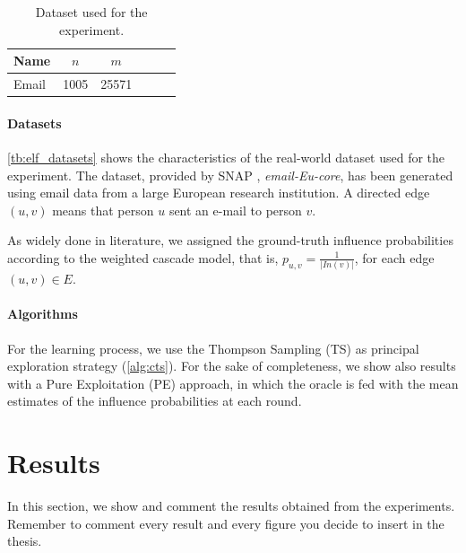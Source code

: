 \begin{example}

\begin{table}[H]
\centering
\renewcommand{\arraystretch}{1.2}
\begin{tabular}{|l|c|c|c|c|c|}\hline
\textbf{Name}&$n$&$m$\\ \hline\hline
Email&1005&25571\\ \hline
\end{tabular}
\caption{Dataset used for the experiment.}
\label{tb:elf_datasets}
\end{table}

\paragraph{Datasets} \autoref{tb:elf_datasets} shows the characteristics of the real-world dataset used for the experiment. The dataset, provided by SNAP \cite{snapnets}, \emph{email-Eu-core}, has been generated using email data from a large European research institution. A directed edge $(u, v)$ means that person $u$ sent an e-mail to person $v$.

As widely done in literature, we assigned the ground-truth influence probabilities according to the weighted cascade model, that is, $p_{u,v}=\frac{1}{|In(v)|}$, for each edge $(u,v) \in E$.

\paragraph{Algorithms}

For the learning process, we use the Thompson Sampling (TS) as principal exploration strategy (\autoref{alg:cts}). For the sake of completeness, we show also results with a Pure Exploitation (PE) approach, in which the oracle is fed with the mean estimates of the influence probabilities at each round.

\end{example}

\section{Results}

In this section, we show and comment the results obtained from the experiments. Remember to comment every result and every figure you decide to insert in the thesis.

